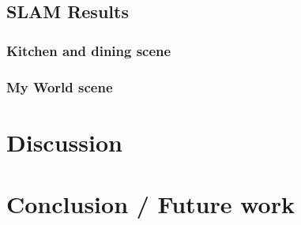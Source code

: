 \documentclass[10pt,journal,compsoc]{IEEEtran}
\begin{document}
\subsection{SLAM Results}
\subsubsection{Kitchen and dining scene}

\subsubsection{My World scene}

\section{Discussion}


\section{Conclusion / Future work}
\end{document}
